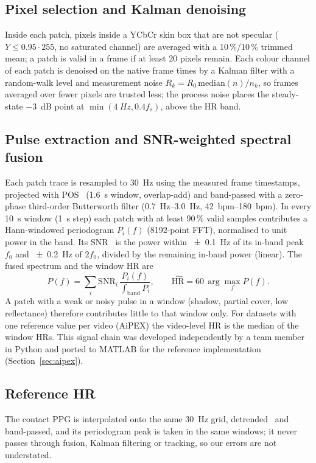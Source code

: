 \documentclass[conference]{IEEEtran}
\begin{document}
\subsection{Pixel selection and Kalman denoising}
Inside each patch, pixels inside a YCbCr skin box that are not specular ($Y\le0.95\cdot255$, no saturated channel) are
averaged with a 10\,\%/10\,\% trimmed mean; a patch is valid in a frame if at least 20 pixels remain. Each colour
channel of each patch is denoised on the native frame times by a Kalman filter with a random-walk level and measurement
noise $R_k = R_0\,\mathrm{median}(n)/n_k$, so frames averaged over fewer pixels are trusted less; the process noise places
the steady-state \SI{-3}{dB} point at $\min(\SI{4}{Hz}, 0.4 f_s)$, above the HR band.

\subsection{Pulse extraction and SNR-weighted spectral fusion}
Each patch trace is resampled to \SI{30}{Hz} using the measured frame timestamps, projected with POS~\cite{wang2017pos}
(\SI{1.6}{s} window, overlap-add) and band-passed with a zero-phase third-order Butterworth filter
(\SIrange{0.7}{3.0}{Hz}, \SIrange{42}{180}{bpm}). In every \SI{10}{s} window (\SI{1}{s} step) each patch with at least
90\,\% valid samples contributes a Hann-windowed periodogram $P_i(f)$ (8192-point FFT), normalised to unit power in the
band. Its SNR~\cite{dehaan2013chrom} is the power within \SI{\pm0.1}{Hz} of its in-band peak $f_0$ and \SI{\pm0.2}{Hz} of
$2f_0$, divided by the remaining in-band power (linear). The fused spectrum and the window HR are
\begin{equation}
  P(f) = \sum_i \mathrm{SNR}_i\,\frac{P_i(f)}{\int_{\mathrm{band}} P_i},\qquad
  \widehat{\mathrm{HR}} = 60\,\arg\max_f P(f).
\end{equation}
A patch with a weak or noisy pulse in a window (shadow, partial cover, low reflectance) therefore contributes little to
that window only. For datasets with one reference value per video (AiPEX) the video-level HR is the median of the window
HRs. This signal chain was developed independently by a team member in Python and ported to MATLAB for the reference
implementation (Section~\ref{sec:aipex}).

\subsection{Reference HR}
The contact PPG is interpolated onto the same \SI{30}{Hz} grid, detrended~\cite{tarvainen2002detrending} and band-passed, and its periodogram peak is
taken in the same windows; it never passes through fusion, Kalman filtering or tracking, so our errors are not understated.
\end{document}
